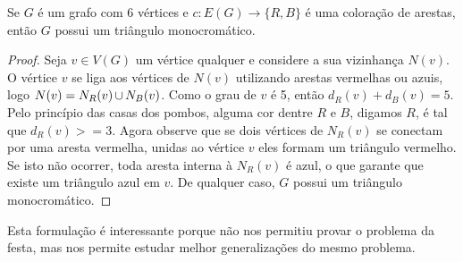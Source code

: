 \begin{theorem}
Se $G$ é um grafo com 6 vértices e $c: E(G) \to \{ R,B\}$ é uma coloração de arestas, então $G$ possui um triângulo monocromático.
\end{theorem}
\begin{proof}
Seja $v \in V(G)$ um vértice qualquer e considere a sua vizinhança $N(v)$. O vértice $v$ se liga aos vértices de $N(v)$ utilizando arestas vermelhas ou azuis, logo $N(v) = N_R(v) \operatorname{\cup} N_B(v)$. Como o grau de $v$ é 5, então $d_R(v) + d_B(v) = 5$. Pelo princípio das casas dos pombos, alguma cor dentre $R$ e $B$, digamos $R$, é tal que $d_R(v) >= 3$. Agora observe que se dois vértices de $N_R(v)$ se conectam por uma aresta vermelha, unidas ao vértice $v$ eles formam um triângulo vermelho. Se isto não ocorrer, toda aresta interna à $N_R(v)$ é azul, o que garante que existe um triângulo azul em $v$. De qualquer caso, $G$ possui um triângulo monocromático.

\end{proof}

Esta formulação é interessante porque não nos permitiu provar o problema da festa, mas nos permite estudar melhor generalizações do mesmo problema.












